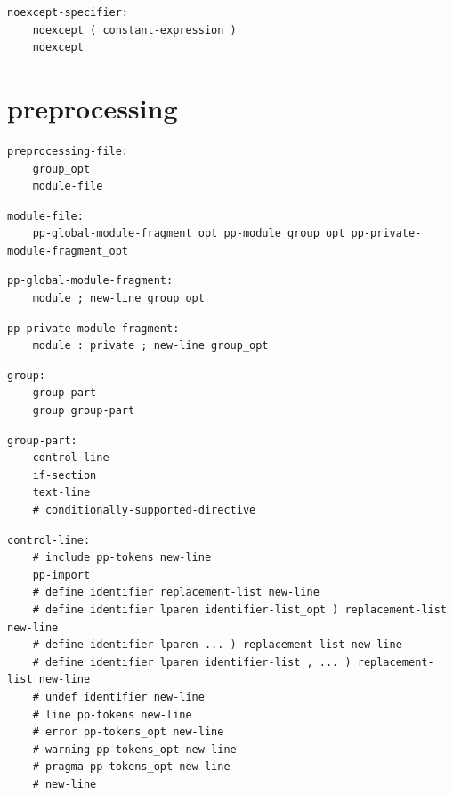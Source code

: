 \noindent\textbf{\texttt{}}\par
\begin{lstlisting}
noexcept-specifier:
    noexcept ( constant-expression )
    noexcept
\end{lstlisting}

\section{preprocessing}

\noindent\textbf{\texttt{}}\par
\begin{lstlisting}
preprocessing-file:
    group_opt
    module-file
\end{lstlisting}

\noindent\textbf{\texttt{}}\par
\begin{lstlisting}
module-file:
    pp-global-module-fragment_opt pp-module group_opt pp-private-module-fragment_opt
\end{lstlisting}

\noindent\textbf{\texttt{}}\par
\begin{lstlisting}
pp-global-module-fragment:
    module ; new-line group_opt
\end{lstlisting}

\noindent\textbf{\texttt{}}\par
\begin{lstlisting}
pp-private-module-fragment:
    module : private ; new-line group_opt
\end{lstlisting}

\noindent\textbf{\texttt{}}\par
\begin{lstlisting}
group:
    group-part
    group group-part
\end{lstlisting}

\noindent\textbf{\texttt{}}\par
\begin{lstlisting}
group-part:
    control-line
    if-section
    text-line
    # conditionally-supported-directive
\end{lstlisting}

\noindent\textbf{\texttt{}}\par
\begin{lstlisting}
control-line:
    # include pp-tokens new-line
    pp-import
    # define identifier replacement-list new-line
    # define identifier lparen identifier-list_opt ) replacement-list new-line
    # define identifier lparen ... ) replacement-list new-line
    # define identifier lparen identifier-list , ... ) replacement-list new-line
    # undef identifier new-line
    # line pp-tokens new-line
    # error pp-tokens_opt new-line
    # warning pp-tokens_opt new-line
    # pragma pp-tokens_opt new-line
    # new-line
\end{lstlisting}

